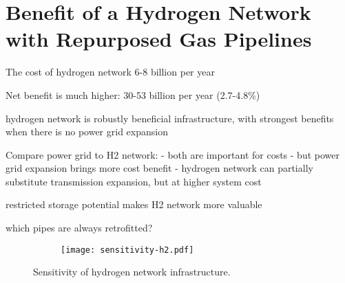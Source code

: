 \section*{Benefit of a Hydrogen Network with Repurposed Gas Pipelines}
\label{sec:h2}

The cost of hydrogen network 6-8 billion per year

Net benefit is much higher: 30-53 billion per year (2.7-4.8\%)

hydrogen network is robustly beneficial infrastructure, with strongest benefits when there is no power grid expansion

Compare power grid to H2 network:
- both are important for costs
- but power grid expansion brings more cost benefit
- hydrogen network can partially substitute transmission expansion, but at higher system cost

restricted storage potential makes H2 network more valuable

which pipes are always retrofitted?

\begin{figure}
    \centering
    \begin{subfigure}[t]{\textwidth}
        \centering
        \texttt{[image: sensitivity-h2.pdf]}
    \end{subfigure}
    \caption{Sensitivity of hydrogen network infrastructure.}
    \label{fig:h2-restriction}
\end{figure}